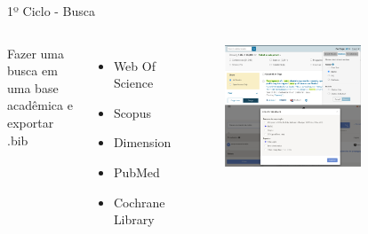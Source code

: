 \begin{frame}{1º Ciclo - Busca}
	\begin{columns}
        Fazer uma busca em uma base acadêmica e exportar .bib
        \begin{itemize}
            \item Web Of Science
            \item Scopus
            \item Dimension
            \item PubMed
            \item Cochrane Library
        \end{itemize}
		\begin{figure}[hb]
            \includegraphics[width=0.7\textwidth]{figures/bases.png}
		\end{figure}
	\end{columns}
\end{frame}

